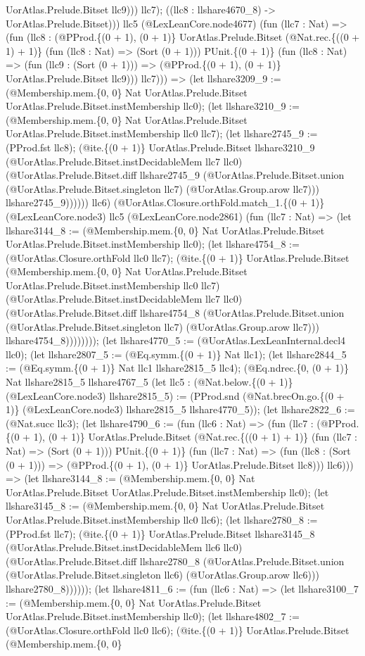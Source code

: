 \documentclass[11pt]{article}
\begin{document}
UorAtlas.Prelude.Bitset llc9))) llc7); ((llc8 : llshare4670\_8) -> UorAtlas.Prelude.Bitset))) llc5 (@LexLeanCore.node4677) (fun (llc7 : Nat) => (fun (llc8 : (@PProd.\{(0 + 1), (0 + 1)\} UorAtlas.Prelude.Bitset (@Nat.rec.\{((0 + 1) + 1)\} (fun (llc8 : Nat) => (Sort (0 + 1))) PUnit.\{(0 + 1)\} (fun (llc8 : Nat) => (fun (llc9 : (Sort (0 + 1))) => (@PProd.\{(0 + 1), (0 + 1)\} UorAtlas.Prelude.Bitset llc9))) llc7))) => (let llshare3209\_9 := (@Membership.mem.\{0, 0\} Nat UorAtlas.Prelude.Bitset UorAtlas.Prelude.Bitset.instMembership llc0); (let llshare3210\_9 := (@Membership.mem.\{0, 0\} Nat UorAtlas.Prelude.Bitset UorAtlas.Prelude.Bitset.instMembership llc0 llc7); (let llshare2745\_9 := (PProd.fst llc8); (@ite.\{(0 + 1)\} UorAtlas.Prelude.Bitset llshare3210\_9 (@UorAtlas.Prelude.Bitset.instDecidableMem llc7 llc0) (@UorAtlas.Prelude.Bitset.diff llshare2745\_9 (@UorAtlas.Prelude.Bitset.union (@UorAtlas.Prelude.Bitset.singleton llc7) (@UorAtlas.Group.arow llc7))) llshare2745\_9)))))) llc6) (@UorAtlas.Closure.orthFold.match\_1.\{(0 + 1)\} (@LexLeanCore.node3) llc5 (@LexLeanCore.node2861) (fun (llc7 : Nat) => (let llshare3144\_8 := (@Membership.mem.\{0, 0\} Nat UorAtlas.Prelude.Bitset UorAtlas.Prelude.Bitset.instMembership llc0); (let llshare4754\_8 := (@UorAtlas.Closure.orthFold llc0 llc7); (@ite.\{(0 + 1)\} UorAtlas.Prelude.Bitset (@Membership.mem.\{0, 0\} Nat UorAtlas.Prelude.Bitset UorAtlas.Prelude.Bitset.instMembership llc0 llc7) (@UorAtlas.Prelude.Bitset.instDecidableMem llc7 llc0) (@UorAtlas.Prelude.Bitset.diff llshare4754\_8 (@UorAtlas.Prelude.Bitset.union (@UorAtlas.Prelude.Bitset.singleton llc7) (@UorAtlas.Group.arow llc7))) llshare4754\_8)))))))); (let llshare4770\_5 := (@UorAtlas.LexLeanInternal.decl4 llc0); (let llshare2807\_5 := (@Eq.symm.\{(0 + 1)\} Nat llc1); (let llshare2844\_5 := (@Eq.symm.\{(0 + 1)\} Nat llc1 llshare2815\_5 llc4); (@Eq.ndrec.\{0, (0 + 1)\} Nat llshare2815\_5 llshare4767\_5 (let llc5 : (@Nat.below.\{(0 + 1)\} (@LexLeanCore.node3) llshare2815\_5) := (PProd.snd (@Nat.brecOn.go.\{(0 + 1)\} (@LexLeanCore.node3) llshare2815\_5 llshare4770\_5)); (let llshare2822\_6 := (@Nat.succ llc3); (let llshare4790\_6 := (fun (llc6 : Nat) => (fun (llc7 : (@PProd.\{(0 + 1), (0 + 1)\} UorAtlas.Prelude.Bitset (@Nat.rec.\{((0 + 1) + 1)\} (fun (llc7 : Nat) => (Sort (0 + 1))) PUnit.\{(0 + 1)\} (fun (llc7 : Nat) => (fun (llc8 : (Sort (0 + 1))) => (@PProd.\{(0 + 1), (0 + 1)\} UorAtlas.Prelude.Bitset llc8))) llc6))) => (let llshare3144\_8 := (@Membership.mem.\{0, 0\} Nat UorAtlas.Prelude.Bitset UorAtlas.Prelude.Bitset.instMembership llc0); (let llshare3145\_8 := (@Membership.mem.\{0, 0\} Nat UorAtlas.Prelude.Bitset UorAtlas.Prelude.Bitset.instMembership llc0 llc6); (let llshare2780\_8 := (PProd.fst llc7); (@ite.\{(0 + 1)\} UorAtlas.Prelude.Bitset llshare3145\_8 (@UorAtlas.Prelude.Bitset.instDecidableMem llc6 llc0) (@UorAtlas.Prelude.Bitset.diff llshare2780\_8 (@UorAtlas.Prelude.Bitset.union (@UorAtlas.Prelude.Bitset.singleton llc6) (@UorAtlas.Group.arow llc6))) llshare2780\_8)))))); (let llshare4811\_6 := (fun (llc6 : Nat) => (let llshare3100\_7 := (@Membership.mem.\{0, 0\} Nat UorAtlas.Prelude.Bitset UorAtlas.Prelude.Bitset.instMembership llc0); (let llshare4802\_7 := (@UorAtlas.Closure.orthFold llc0 llc6); (@ite.\{(0 + 1)\} UorAtlas.Prelude.Bitset (@Membership.mem.\{0, 0\} 
\end{document}
